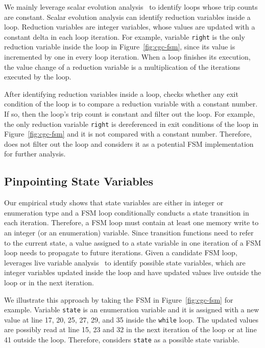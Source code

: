 We mainly leverage scalar evolution analysis~\cite{scalar-1,scalar-2,scalar-3} 
to identify loops whose trip counts are constant. 
Scalar evolution analysis can identify reduction variables inside a loop.
Reduction variables are integer variables, 
whose values are updated 
with a constant delta in each loop iteration. 
For example, variable \texttt{right} is the only reduction 
variable inside the loop in Figure~\ref{fig:cgc-fsm}, 
since its value is incremented by one in every loop iteration.  
When a loop finishes its execution, the value change of a 
reduction variable is a multiplication of 
the iterations executed by the loop. 

After identifying reduction variables inside a loop,
\Tool{} checks whether any exit condition of the loop is to compare 
a reduction variable with a constant number. 
If so, then the loop’s trip count is constant and \Tool{} filter out the loop. 
For example, the only reduction variable \texttt{right} is dereferenced 
in exit conditions of the loop in Figure~\ref{fig:cgc-fsm} 
and it is not compared with a constant number.
Therefore, \Tool{} does not filter out the loop and considers it 
as a potential FSM implementation 
for further analysis. 

\subsection{Pinpointing State Variables}
\label{sec:variable}
Our empirical study shows that state variables are either in integer or enumeration type
and a FSM loop conditionally conducts a state transition in each iteration. 
Therefore, a FSM loop must contain at least one memory write to an integer 
(or an enumeration) variable. 
Since transition functions need to refer to the current state, 
a value assigned to a state variable in one iteration of a FSM loop needs 
to propagate to future iterations.
Given a candidate FSM loop, 
\Tool{} leverages live variable 
analysis~\cite{live-analysis} to 
identify possible state variables, which are integer variables 
updated inside the loop and have updated values live outside the loop 
or in the next iteration. 


We illustrate this approach by taking the FSM 
in Figure~\ref{fig:cgc-fsm} for example. 
Variable \texttt{state} is an enumeration variable and it is assigned 
with a new value at 
line 17, 20, 25, 27, 29, and 35 inside the \texttt{while} loop. 
The updated values are possibly read at line 15, 23 and 32 
in the next iteration of the loop or at line 41 outside the loop.
Therefore, \Tool{} considers \texttt{state} as a possible 
state variable.  

